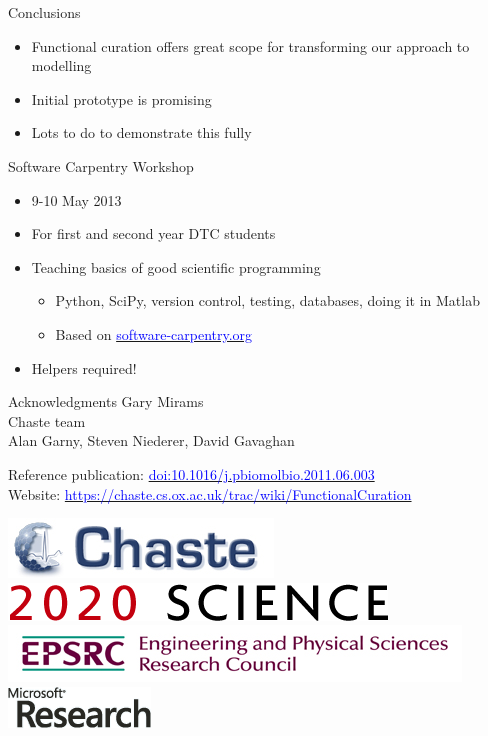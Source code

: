 \documentclass[t,xcolor={usenames,dvipsnames}]{beamer}
\newcommand{\myhref}[2]{\href{#1}{\textcolor{Blue}{#2}}}
\newcommand{\myurl}[1]{\myhref{#1}{#1}}
\newcommand{\doi}[1]{\myhref{http://dx.doi.org/#1}{doi:#1}}
\begin{document}
\begin{frame}{Conclusions}
\begin{itemize}
\item Functional curation offers great scope for transforming our approach to modelling
\item Initial prototype is promising
\item Lots to do to demonstrate this fully
\end{itemize}
\end{frame}


\begin{frame}{Software Carpentry Workshop}
\begin{itemize}
\item 9-10 May 2013
\item For first and second year DTC students
\item Teaching basics of good scientific programming
  \begin{itemize}
  \item Python, SciPy, version control, testing, databases, doing it in Matlab
  \item Based on \myhref{http://software-carpentry.org/}{software-carpentry.org}
  \end{itemize}
\item Helpers required!
\end{itemize}
\end{frame}


\begin{frame}{Acknowledgments}
Gary Mirams\\
Chaste team\\
Alan Garny, Steven Niederer, David Gavaghan

Reference publication: \doi{10.1016/j.pbiomolbio.2011.06.003}\\
Website: \myurl{https://chaste.cs.ox.ac.uk/trac/wiki/FunctionalCuration}

\begin{center}
\includegraphics[scale=.9]{chaste-266x60}\\ \vspace{.3cm}
\includegraphics[scale=.7]{logo2020science}\\ \vspace{.4cm}
\includegraphics[width=.55\textwidth]{EPSRC1RGBLO} \hspace{.1cm}
\includegraphics[scale=.55]{logo_msr}
\end{center}
\end{frame}
\end{document}
